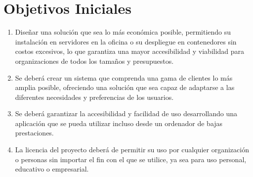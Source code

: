 \section{Objetivos Iniciales}

\begin{enumerate}
    \item Diseñar una solución que sea lo más económica posible, permitiendo su instalación en servidores en la oficina o su despliegue en contenedores sin costos excesivos, lo que garantiza una mayor accesibilidad y viabilidad para organizaciones de todos los tamaños y presupuestos.
    \item Se deberá crear un sistema que comprenda una gama de clientes lo más amplia posible, ofreciendo una solución que sea capaz de adaptarse a las diferentes necesidades y preferencias de los usuarios.
    \item Se deberá garantizar la accesibilidad y facilidad de uso desarrollando una aplicación que se pueda utilizar incluso desde un ordenador de bajas prestaciones.
    \item La licencia del proyecto deberá de permitir su uso por cualquier organización o personas sin importar el fin con el que se utilice, ya sea para uso personal, educativo o empresarial.
\end{enumerate}